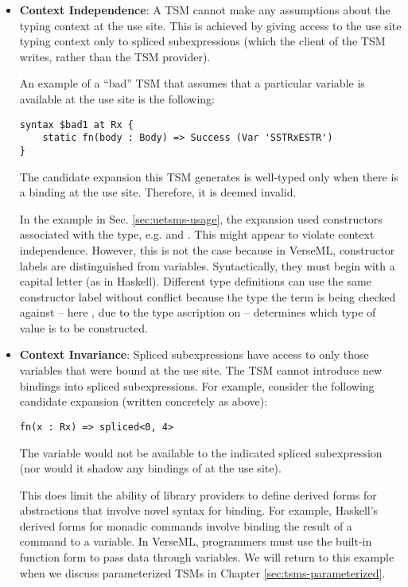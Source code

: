 \begin{itemize}
\item \textbf{Context Independence}: A TSM cannot make any assumptions about the typing context at the use site. This is achieved by giving access to the use site typing context only to spliced subexpressions (which the client of the TSM writes, rather than the TSM provider). 

An example of a ``bad'' TSM that assumes that a particular variable is available at the use site is the following:
\begin{lstlisting}[numbers=none]
syntax $bad1 at Rx {
	static fn(body : Body) => Success (Var 'SSTRxESTR')
}
\end{lstlisting}
The candidate expansion this TSM generates is well-typed only when there is a binding  at the use site. Therefore, it is deemed invalid.

In the example in Sec. \ref{sec:uetsms-usage}, the expansion used constructors associated with the  type, e.g.  and . This might appear to violate context independence. However, this is not the case because in VerseML, constructor labels are distinguished from variables. Syntactically, they must begin with a capital letter (as in Haskell). Different type definitions can use the same constructor label without conflict because the type the term is being checked against -- here , due to the type ascription on  -- determines which type of value is to be constructed.

\item \textbf{Context Invariance}: Spliced subexpressions have access to only those variables that were bound at the use site. The TSM cannot introduce new bindings into spliced subexpressions. For example, consider the following candidate expansion (written concretely as above):
\begin{lstlisting}[numbers=none]
fn(x : Rx) => spliced<0, 4>
\end{lstlisting}
The variable  would not be available to the indicated spliced subexpression (nor would it shadow any bindings of  at the use site).

This does limit the ability of library providers to define derived forms for abstractions that involve novel syntax for binding. For example, Haskell's derived forms for monadic commands involve binding the result of a command to a variable. In VerseML, programmers must use the built-in function form to pass data through variables. We will return to this example when we discuss parameterized TSMs in Chapter \ref{sec:tsms-parameterized}.
\end{itemize}

